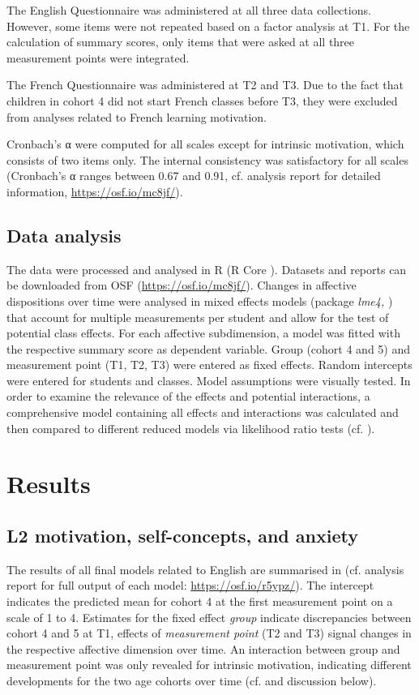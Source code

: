 \documentclass[output=paper]{langsci/langscibook}
\begin{document}
The English Questionnaire was administered at all three data collections. However, some items were not repeated based on a factor analysis at T1. For the calculation of summary scores, only items that were asked at all three measurement points were integrated. 

The French Questionnaire was administered at T2 and T3. Due to the fact that children in cohort 4 did not start French classes before T3, they were excluded from analyses related to French learning motivation.

Cronbach’s α were computed for all scales except for intrinsic motivation, which consists of two items only. The internal consistency was satisfactory for all scales (Cronbach’s α ranges between 0.67 and 0.91, cf. analysis report for detailed information, \url{https://osf.io/mc8jf/}).

\subsection{Data analysis}

The data were processed and analysed in R (R Core \citealt{Team2019}). Datasets and reports can be downloaded from OSF (\url{https://osf.io/mc8jf/}). Changes in affective dispositions over time were analysed in mixed effects models (package \textit{lme4,} \citealt{BatesEtAl2015}) that account for multiple measurements per student and allow for the test of potential class effects. For each affective subdimension, a model was fitted with the respective summary score as dependent variable. Group (cohort 4 and 5) and measurement point (T1, T2, T3) were entered as fixed effects. Random intercepts were entered for students and classes. Model assumptions were visually tested. In order to examine the relevance of the effects and potential interactions, a comprehensive model containing all effects and interactions was calculated and then compared to different reduced models via likelihood ratio tests (cf. \citealt{Winter2013}). 

\section{Results}
\subsection{L2 motivation, self-concepts, and anxiety}

The results of all final models related to English are summarised in   (cf. analysis report for full output of each model: \url{https://osf.io/r5ypz/}). The intercept indicates the predicted mean for cohort 4 at the first measurement point on a scale of 1 to 4. Estimates for the fixed effect \textit{group} indicate discrepancies between cohort 4 and 5 at T1, effects of \textit{measurement point} (T2 and T3) signal changes in the respective affective dimension over time. An interaction between group and measurement point was only revealed for intrinsic motivation, indicating different developments for the two age cohorts over time (cf.  and discussion below).
\end{document}
